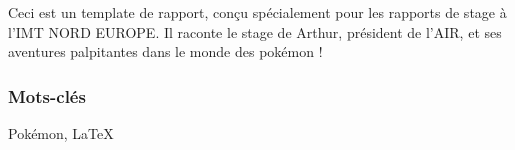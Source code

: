 \documentclass[../main.tex]{subfiles}
\begin{document}

 
Ceci est un template de rapport, conçu spécialement pour les rapports de stage à l'IMT NORD EUROPE. Il raconte le stage de Arthur, président de l'AIR, et ses aventures palpitantes dans le monde des pokémon ! \\

\subsubsection{Mots-clés}
Pokémon, LaTeX
\end{document}
